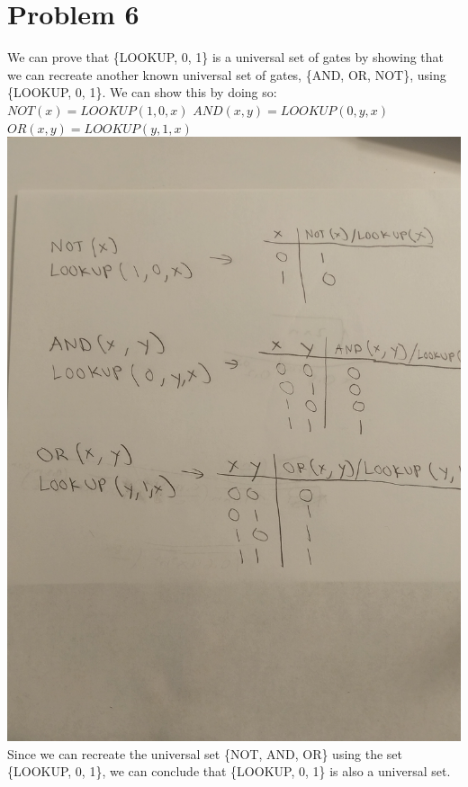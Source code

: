 \documentclass[12pt]{article}
\begin{document}
\newpage
\section*{Problem 6}
We can prove that \{LOOKUP, 0, 1\} is a universal set of gates by showing that we can recreate another known
universal set of gates, \{AND, OR, NOT\}, using \{LOOKUP, 0, 1\}. We can show this by doing so:
\newline
\newline
$NOT(x) = LOOKUP(1, 0, x)$
\newline
$AND(x, y) = LOOKUP(0, y, x)$
\newline
$OR(x, y)=LOOKUP(y, 1, x)$
\newline
\newline
\includegraphics[scale=0.08, angle=-90]{problem6.jpg}
\newline
\newline
Since we can recreate the universal set \{NOT, AND, OR\} using the set \{LOOKUP, 0, 1\}, we can conclude that
\{LOOKUP, 0, 1\} is also a universal set.
\end{document}

